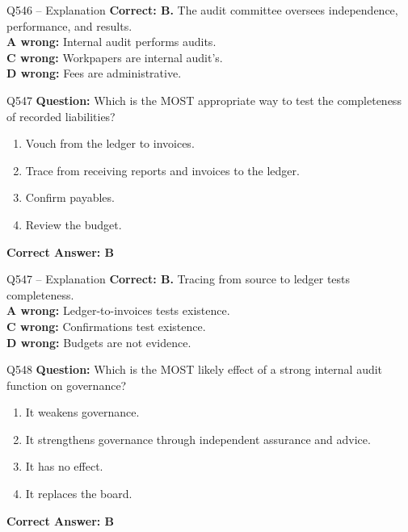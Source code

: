 \documentclass[aspectratio=169,10pt]{beamer}
\begin{document}
	\begin{frame}[t]{Q546 -- Explanation}
		\small
		\textbf{Correct: B.} The audit committee oversees independence, performance, and results. \\[4pt]
		\textbf{A wrong:} Internal audit performs audits. \\[2pt]
		\textbf{C wrong:} Workpapers are internal audit's. \\[2pt]
		\textbf{D wrong:} Fees are administrative.
	\end{frame}
	
	\begin{frame}[t]{Q547}
		\small
		\textbf{Question:} Which is the MOST appropriate way to test the completeness of recorded liabilities?
		\begin{enumerate}[label=\Alph*.,itemsep=1pt,topsep=2pt]
			\item Vouch from the ledger to invoices.
			\item Trace from receiving reports and invoices to the ledger.
			\item Confirm payables.
			\item Review the budget.
		\end{enumerate}
		\vspace{4pt}
		\textbf{Correct Answer: B}
	\end{frame}
	
	\begin{frame}[t]{Q547 -- Explanation}
		\small
		\textbf{Correct: B.} Tracing from source to ledger tests completeness. \\[4pt]
		\textbf{A wrong:} Ledger-to-invoices tests existence. \\[2pt]
		\textbf{C wrong:} Confirmations test existence. \\[2pt]
		\textbf{D wrong:} Budgets are not evidence.
	\end{frame}
	
	\begin{frame}[t]{Q548}
		\small
		\textbf{Question:} Which is the MOST likely effect of a strong internal audit function on governance?
		\begin{enumerate}[label=\Alph*.,itemsep=1pt,topsep=2pt]
			\item It weakens governance.
			\item It strengthens governance through independent assurance and advice.
			\item It has no effect.
			\item It replaces the board.
		\end{enumerate}
		\vspace{4pt}
		\textbf{Correct Answer: B}
	\end{frame}
	
\end{document}
